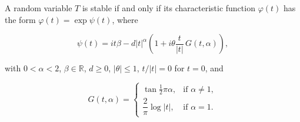 A random variable $T$ is stable if and only if its characteristic function $\varphi(t)$ has the form $\varphi(t) = \exp \psi(t)$, where

$$\psi(t) = it\beta - d|t|^\alpha \left(1 + i\theta \frac{t}{|t|} \, G(t, \alpha)\right),$$

with $0 < \alpha < 2$, $\beta \in \mathbb{R}$, $d \geq 0$, $|\theta| \leq 1$, $t/|t| = 0$ for $t = 0$, and

$$G(t, \alpha) = \begin{cases}
\tan \frac{1}{2}\pi\alpha, & \text{if } \alpha \neq 1,\\[4pt]
\dfrac{2}{\pi} \log |t|, & \text{if } \alpha = 1.
\end{cases}$$

